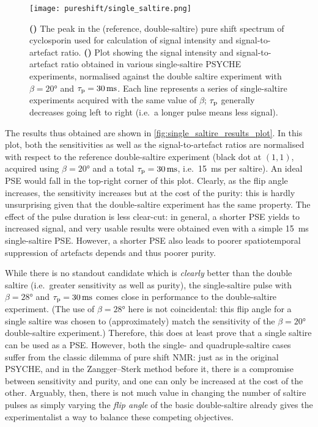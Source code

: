 \begin{figure}[htb]
    \centering
    \texttt{[image: pureshift/single\_saltire.png]}
    {\label{fig:single_saltire_results_spec}}
    {\label{fig:single_saltire_results_plot}}
    \caption[Single-saltire PSYCHE results]{
        \textbf{()} The peak in the (reference, double-saltire) pure shift spectrum of cyclosporin used for calculation of signal intensity and signal-to-artefact ratio.
        \textbf{()} Plot showing the signal intensity and signal-to-artefact ratio obtained in various single-saltire PSYCHE experiments, normalised against the double saltire experiment with $\beta = \ang{20}$ and $\taup = \SI{30}{\ms}$.
        Each line represents a series of single-saltire experiments acquired with the same value of $\beta$; $\tau_\mathrm{p}$ generally decreases going left to right (i.e.\ a longer pulse means less signal). 
    }
    \label{fig:single_saltire_results}
\end{figure}

The results thus obtained are shown in \cref{fig:single_saltire_results_plot}.
In this plot, both the sensitivities as well as the signal-to-artefact ratios are normalised with respect to the reference double-saltire experiment (black dot at $(1, 1)$, acquired using $\beta = \ang{20}$ and a total $\taup = \SI{30}{\ms}$, i.e.\ \SI{15}{\ms} per saltire).
An ideal PSE would fall in the top-right corner of this plot.
Clearly, as the flip angle increases, the sensitivity increases but at the cost of the purity: this is hardly unsurprising given that the double-saltire experiment has the same property.
The effect of the pulse duration is less clear-cut: in general, a shorter PSE yields to increased signal, and very usable results were obtained even with a simple \SI{15}{\ms} single-saltire PSE.
However, a shorter PSE also leads to poorer spatiotemporal suppression of artefacts depends and thus poorer purity.

While there is no standout candidate which is \textit{clearly} better than the double saltire (i.e.\ greater sensitivity as well as purity), the single-saltire pulse with $\beta = \ang{28}$ and $\taup = \SI{30}{\ms}$ comes close in performance to the double-saltire experiment.
(The use of $\beta = \ang{28}$ here is not coincidental: this flip angle for a single saltire was chosen to (approximately) match the sensitivity of the $\beta = \ang{20}$ double-saltire experiment.)
Therefore, this does at least prove that a single saltire can be used as a PSE.
However, both the single- and quadruple-saltire cases suffer from the classic dilemma of pure shift NMR: just as in the original PSYCHE, and in the Zangger--Sterk method before it, there is a compromise between sensitivity and purity, and one can only be increased at the cost of the other.
Arguably, then, there is not much value in changing the number of saltire pulses as simply varying the \textit{flip angle} of the basic double-saltire already gives the experimentalist a way to balance these competing objectives.
